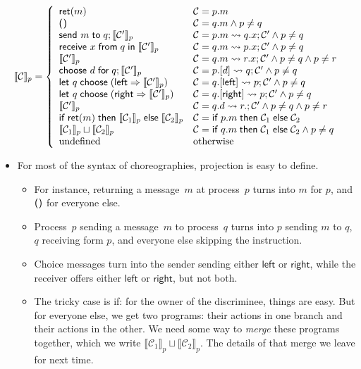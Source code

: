 \documentclass{lecturenotes}
\newcommand{\unit}{\ensuremath{\textsf{(}\mkern0.5mu\textsf{)}}}
\newcommand{\ite}[3]{\ensuremath{\textsf{if}~#1 \mathrel{\textsf{then}} #2 \mathrel{\textsf{else}} #3}}
\newcommand{\send}[2]{\ensuremath{\textsf{send}~#1 \mathrel{\textsf{to}} #2}}
\newcommand{\recv}[3]{\ensuremath{\textsf{receive}~#1 \mathrel{\textsf{from}} #2} \mathrel{\textsf{in}} #3}
\newcommand{\Left}{\textsf{left}\xspace}
\newcommand{\Right}{\textsf{right}\xspace}
\newcommand{\choosefor}[2]{\ensuremath{\textsf{choose}~#1 \mathrel{\textsf{for}} #2}}
\newcommand{\letchooseL}[2]{\ensuremath{\textsf{let}~#1 \mathrel{\textsf{choose}} (\Left \Rightarrow #2)}}
\newcommand{\letchooseR}[2]{\ensuremath{\textsf{let}~#1 \mathrel{\textsf{choose}} (\Right \Rightarrow #2)}}
\newcommand{\ret}[1]{\ensuremath{\textsf{ret}(#1)}}
\newcommand{\sendrecv}[4]{\ensuremath{#1.#2 \rightsquigarrow #3.#4}}
\newcommand{\syncmsg}[3]{\ensuremath{#1.[#2] \rightsquigarrow #3}}
\newcommand{\chorif}[4]{\ensuremath{\textsf{if}~#1.#2 \mathrel{\textsf{then}} #3 \mathrel{\textsf{else}} #4}}
\newcommand{\projection}[2]{\ensuremath{\llbracket #1 \rrbracket_{#2}}}
\begin{document}
$$
\projection{\mathcal{C}}{p} = \left\{\begin{array}{ll}
  \ret{m} & \mathcal{C} = p.m\\
  \unit & \mathcal{C} = q.m \land p \neq q\\
  \send{m}{q}; \projection{\mathcal{C}'}{p} & \mathcal{C} = \sendrecv{p}{m}{q}{x}; \mathcal{C}' \land p \neq q\\
  \recv{x}{q}{\projection{\mathcal{C}'}{p}} & \mathcal{C} = \sendrecv{q}{m}{p}{x}; \mathcal{C}' \land p \neq q\\
  \projection{\mathcal{C}'}{p} & \mathcal{C} = \sendrecv{q}{m}{r}{x}; \mathcal{C}' \land p \neq q \land p \neq r\\
  \choosefor{d}{q}; \projection{\mathcal{C}'}{p} & \mathcal{C} = \syncmsg{p}{d}{q}; \mathcal{C}' \land p \neq q\\
  \letchooseL{q}{\projection{\mathcal{C}'}{p}} & \mathcal{C} = \syncmsg{q}{\Left}{p}; \mathcal{C}' \land p \neq q\\
  \letchooseR{q}{\projection{\mathcal{C}'}{p}} & \mathcal{C} = \syncmsg{q}{\Right}{p}; \mathcal{C}' \land p \neq q\\
  \projection{\mathcal{C}'}{p} & \mathcal{C} = \sendrecv{q}{d}{r}; \mathcal{C}' \land p \neq q \land p \neq r\\
  \ite{\ret{m}}{\projection{\mathcal{C}_1}{p}}{\projection{\mathcal{C}_2}{p}} & \mathcal{C} = \chorif{p}{m}{\mathcal{C}_1}{\mathcal{C}_2}\\
  \projection{\mathcal{C}_1}{p} \sqcup \projection{\mathcal{C}_2}{p} & \mathcal{C} = \chorif{q}{m}{\mathcal{C}_1}{\mathcal{C}_2} \land p \neq q\\
  \text{undefined} & \text{otherwise}
  \end{array}\right.
$$

\begin{itemize}
\item For most of the syntax of choreographies, projection is easy to define.
  \begin{itemize}
  \item For instance, returning a message~$m$ at process~$p$ turns into $m$ for $p$, and $\unit$ for everyone else.
  \item Process~$p$ sending a message~$m$ to process~$q$ turns into $p$ sending $m$ to $q$, $q$ receiving form $p$, and everyone else skipping the instruction.
  \item Choice messages turn into the sender sending either $\Left$ or $\Right$, while the receiver offers either $\Left$ or $\Right$, but not both.
  \item The tricky case is \textsf{if}: for the owner of the discriminee, things are easy.
    But for everyone else, we get two programs: their actions in one branch and their actions in the other.
    We need some way to \emph{merge} these programs together, which we write $\projection{\mathcal{C}_1}{p} \sqcup \projection{\mathcal{C}_2}{p}$.
    The details of that merge we leave for next time.
  \end{itemize}
\end{itemize}
\end{document}
